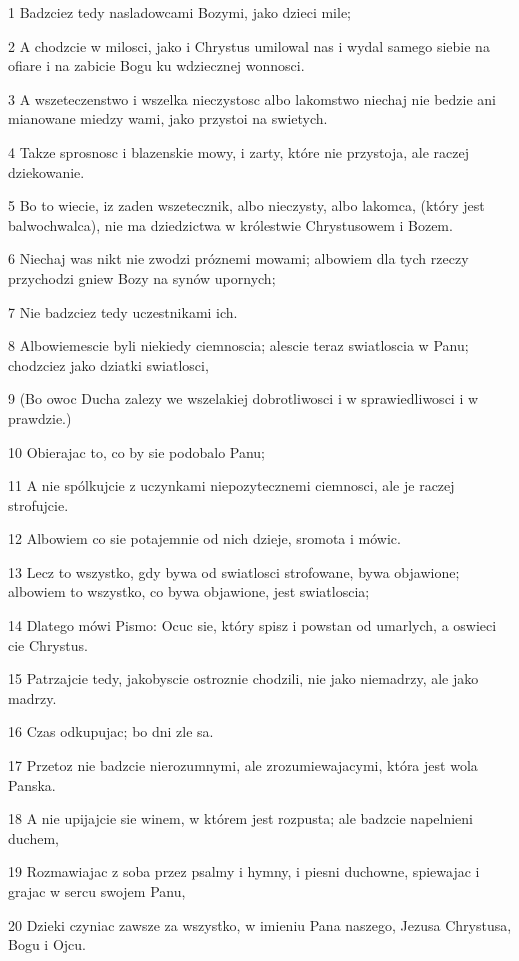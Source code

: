\par 1 Badzciez tedy nasladowcami Bozymi, jako dzieci mile;
\par 2 A chodzcie w milosci, jako i Chrystus umilowal nas i wydal samego siebie na ofiare i na zabicie Bogu ku wdziecznej wonnosci.
\par 3 A wszeteczenstwo i wszelka nieczystosc albo lakomstwo niechaj nie bedzie ani mianowane miedzy wami, jako przystoi na swietych.
\par 4 Takze sprosnosc i blazenskie mowy, i zarty, które nie przystoja, ale raczej dziekowanie.
\par 5 Bo to wiecie, iz zaden wszetecznik, albo nieczysty, albo lakomca, (który jest balwochwalca), nie ma dziedzictwa w królestwie Chrystusowem i Bozem.
\par 6 Niechaj was nikt nie zwodzi próznemi mowami; albowiem dla tych rzeczy przychodzi gniew Bozy na synów upornych;
\par 7 Nie badzciez tedy uczestnikami ich.
\par 8 Albowiemescie byli niekiedy ciemnoscia; alescie teraz swiatloscia w Panu; chodzciez jako dziatki swiatlosci,
\par 9 (Bo owoc Ducha zalezy we wszelakiej dobrotliwosci i w sprawiedliwosci i w prawdzie.)
\par 10 Obierajac to, co by sie podobalo Panu;
\par 11 A nie spólkujcie z uczynkami niepozytecznemi ciemnosci, ale je raczej strofujcie.
\par 12 Albowiem co sie potajemnie od nich dzieje, sromota i mówic.
\par 13 Lecz to wszystko, gdy bywa od swiatlosci strofowane, bywa objawione; albowiem to wszystko, co bywa objawione, jest swiatloscia;
\par 14 Dlatego mówi Pismo: Ocuc sie, który spisz i powstan od umarlych, a oswieci cie Chrystus.
\par 15 Patrzajcie tedy, jakobyscie ostroznie chodzili, nie jako niemadrzy, ale jako madrzy.
\par 16 Czas odkupujac; bo dni zle sa.
\par 17 Przetoz nie badzcie nierozumnymi, ale zrozumiewajacymi, która jest wola Panska.
\par 18 A nie upijajcie sie winem, w którem jest rozpusta; ale badzcie napelnieni duchem,
\par 19 Rozmawiajac z soba przez psalmy i hymny, i piesni duchowne, spiewajac i grajac w sercu swojem Panu,
\par 20 Dzieki czyniac zawsze za wszystko, w imieniu Pana naszego, Jezusa Chrystusa, Bogu i Ojcu.
